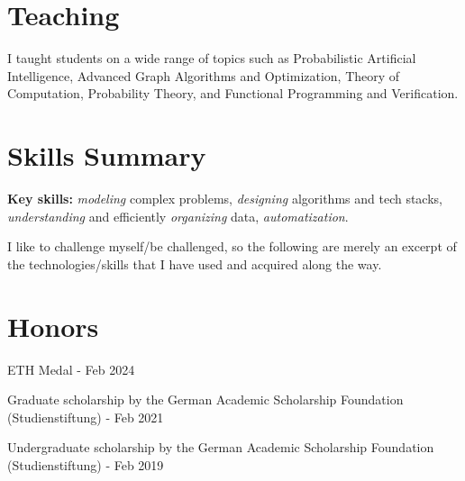 \documentclass[a4paper,20pt]{article}
\begin{document}
\vspace{-5pt}
\section{Teaching}
I taught students on a wide range of topics such as Probabilistic Artificial Intelligence, Advanced Graph Algorithms and Optimization, Theory of Computation, Probability Theory, and Functional Programming and Verification.

\vspace{-5pt}
\section{Skills Summary}
\textbf{Key skills:} \emph{modeling} complex problems, \emph{designing} algorithms and tech stacks, \emph{understanding} and efficiently \emph{organizing} data, \emph{automatization}.%
\vspace{2pt}

I like to challenge myself/be challenged, so the following are merely an excerpt of the technologies/skills that I have used and acquired along the way.
\vspace{-5pt}
\resumeSubHeadingListStart
{}
\resumeSubHeadingListEnd

\section{Honors}
\begin{description}[font=$\bullet$]
\item {ETH Medal - Feb 2024}
\vspace{-5pt}
\item {Graduate scholarship by the German Academic Scholarship Foundation (Studienstiftung) - Feb 2021}
\vspace{-5pt}
\item {Undergraduate scholarship by the German Academic Scholarship Foundation (Studienstiftung) - Feb 2019}
\end{description}
\end{document}
